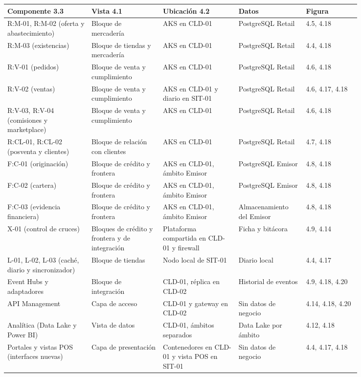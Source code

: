 \documentclass[11pt]{article}
\begin{document}
\begin{longtable}{@{}p{0.20\linewidth}p{0.17\linewidth}p{0.18\linewidth}p{0.16\linewidth}p{0.13\linewidth}@{}}
\toprule Componente 3.3 & Vista 4.1 & Ubicación 4.2 & Datos & Figura \\
\midrule\endhead\bottomrule\endlastfoot
R:M-01, R:M-02 (oferta y abastecimiento) & Bloque de mercadería & AKS en CLD-01 & PostgreSQL Retail & 4.5, 4.18 \\
R:M-03 (existencias) & Bloque de tiendas y mercadería & AKS en CLD-01 & PostgreSQL Retail & 4.4, 4.18 \\
R:V-01 (pedidos) & Bloque de venta y cumplimiento & AKS en CLD-01 & PostgreSQL Retail & 4.6, 4.18 \\
R:V-02 (ventas) & Bloque de venta y cumplimiento & AKS en CLD-01 y diario en SIT-01 & PostgreSQL Retail & 4.6, 4.17, 4.18 \\
R:V-03, R:V-04 (comisiones y marketplace) & Bloque de venta y cumplimiento & AKS en CLD-01 & PostgreSQL Retail & 4.6, 4.18 \\
R:CL-01, R:CL-02 (posventa y clientes) & Bloque de relación con clientes & AKS en CLD-01 & PostgreSQL Retail & 4.7, 4.18 \\
F:C-01 (originación) & Bloque de crédito y frontera & AKS en CLD-01, ámbito Emisor & PostgreSQL Emisor & 4.8, 4.18 \\
F:C-02 (cartera) & Bloque de crédito y frontera & AKS en CLD-01, ámbito Emisor & PostgreSQL Emisor & 4.8, 4.18 \\
F:C-03 (evidencia financiera) & Bloque de crédito y frontera & AKS en CLD-01, ámbito Emisor & Almacenamiento del Emisor & 4.8, 4.18 \\
X-01 (control de cruces) & Bloques de crédito y frontera y de integración & Plataforma compartida en CLD-01 y firewall & Ficha y bitácora & 4.9, 4.14 \\
L-01, L-02, L-03 (caché, diario y sincronizador) & Bloque de tiendas & Nodo local de SIT-01 & Diario local & 4.4, 4.17 \\
Event Hubs y adaptadores & Bloque de integración & CLD-01, réplica en CLD-02 & Historial de eventos & 4.9, 4.18, 4.20 \\
API Management & Capa de acceso & CLD-01 y gateway en CLD-02 & Sin datos de negocio & 4.14, 4.18, 4.20 \\
Analítica (Data Lake y Power BI) & Vista de datos & CLD-01, ámbitos separados & Data Lake por ámbito & 4.12, 4.18 \\
Portales y vistas POS (interfaces nuevas) & Capa de presentación & Contenedores en CLD-01 y vista POS en SIT-01 & Sin datos de negocio & 4.4, 4.17, 4.18 \\

\end{longtable}
\end{document}
